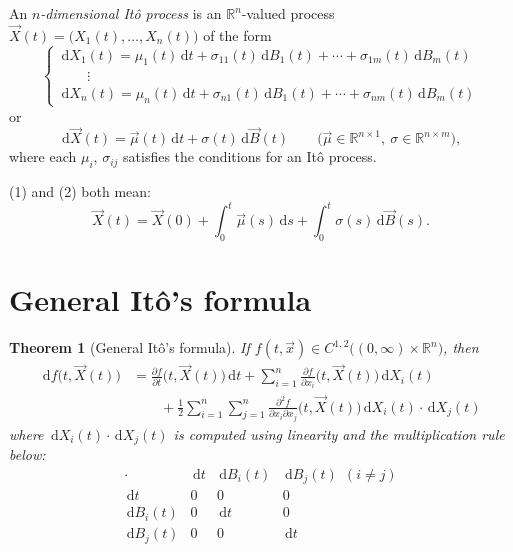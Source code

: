 \documentclass[11pt]{article}
\newcommand{\R}{\mathbb{R}}
\newcommand{\dd}{\,\mathrm{d}}
\theoremstyle{definition}
\theoremstyle{plain}
\newtheorem{theorem}{Theorem}[section]
\begin{document}
\medskip
\noindent An \emph{$n$-dimensional It\^o process} is an $\R^n$-valued process
$\vec X(t)=\bigl(X_1(t),\ldots,X_n(t)\bigr)$ of the form
\begin{equation*}
  \begin{cases}
    \dd X_1(t)=\mu_1(t)\dd t+\sigma_{11}(t)\dd B_1(t)+\cdots+\sigma_{1m}(t)\dd B_m(t)\\[2pt]
    \qquad\vdots\\[2pt]
    \dd X_n(t)=\mu_n(t)\dd t+\sigma_{n1}(t)\dd B_1(t)+\cdots+\sigma_{nm}(t)\dd B_m(t)
  \end{cases}
  \tag*{(1)}
\end{equation*}
or
\begin{equation*}
  \dd\vec X(t)=\vec\mu(t)\dd t+\sigma(t)\dd\vec B(t)
  \qquad\bigl(\vec\mu\in\R^{n\times1},\ \sigma\in\R^{n\times m}\bigr),
  \tag*{(2)}
\end{equation*}
where each $\mu_i$, $\sigma_{ij}$ satisfies the conditions for an It\^o process.

\medskip
\noindent (1) and (2) both mean:
\[
  \vec X(t)=\vec X(0)+\int_0^t\vec\mu(s)\dd s+\int_0^t\sigma(s)\dd\vec B(s).
\]

\section{General It\^o's formula}

\begin{theorem}[General It\^o's formula]
If $f(t,\vec x)\in C^{1,2}\bigl((0,\infty)\times\R^n\bigr)$, then
\begin{align*}
  \dd f\bigl(t,\vec X(t)\bigr)
    &=\frac{\partial f}{\partial t}\bigl(t,\vec X(t)\bigr)\dd t
      +\sum_{i=1}^n\frac{\partial f}{\partial x_i}\bigl(t,\vec X(t)\bigr)\dd X_i(t)\\
    &\qquad+\frac12\sum_{i=1}^n\sum_{j=1}^n
      \frac{\partial^2f}{\partial x_i\partial x_j}\bigl(t,\vec X(t)\bigr)
      \dd X_i(t)\cdot\dd X_j(t)
\end{align*}
where $\dd X_i(t)\cdot\dd X_j(t)$ is computed using linearity and the
multiplication rule below:
\[
  \begin{array}{c|ccc}
    \cdot & \dd t & \dd B_i(t) & \dd B_j(t)\ \ (i\neq j)\\[2pt] \hline
    \dd t & 0 & 0 & 0\\[2pt]
    \dd B_i(t) & 0 & \dd t & 0\\[2pt]
    \dd B_j(t) & 0 & 0 & \dd t
  \end{array}
\]
\end{theorem}
\end{document}
